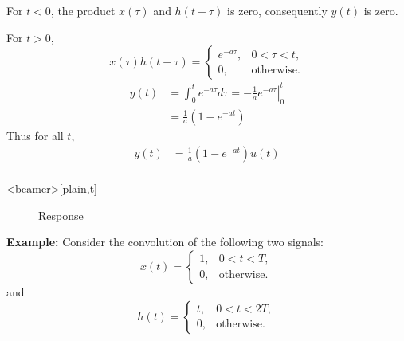\begin{frame}{}
    For $t<0$, the product $x(\tau)$ and $h(t-\tau)$ is zero, consequently $y(t)$ is zero.\par
    For $t>0$,
    \begin{equation*}
        x(\tau)h(t-\tau) = \begin{cases}e^{-a\tau}, & 0 <\tau < t,\\0, & \text{otherwise}.         \end{cases}
    \end{equation*}
    \begin{equation*}
        \begin{split}
            y(t) &= \int_{0}^{t}e^{-a\tau}d\tau = \left.-\frac{1}{a}e^{-a\tau}\right|_0^t\\
            &= \frac{1}{a}(1-e^{-at})
        \end{split}
    \end{equation*}
    Thus for all $t$,
    \begin{equation*}
        \begin{split}
            y(t) &= \frac{1}{a}(1-e^{-at})u(t)\\
        \end{split}
    \end{equation*}

\end{frame}


\begin{frame}<beamer>[plain,t]
    {
    \begin{figure}
      \centering
      
      \caption{Response}\label{fi:ct_conv_example26_sol}
    \end{figure}
    }
\end{frame}

\begin{frame}{}
    \textbf{ Example: } Consider the convolution of the following two signals:
    \begin{equation*}
        x(t) = \begin{cases}1,& 0 < t < T,\\ 0, & \text{otherwise}.\end{cases}
    \end{equation*}
    and
    \begin{equation*}
        h(t) = \begin{cases}t,& 0 < t < 2T,\\ 0, & \text{otherwise}.\end{cases}
    \end{equation*}


    {
        \begin{columns}
        \end{columns}
    }
\end{frame}

